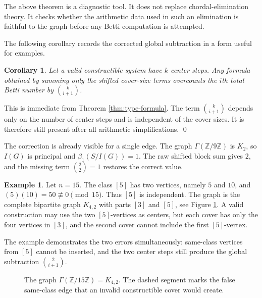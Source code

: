 \documentclass[12pt]{article}
\newtheorem{corollary}[theorem]{Corollary}
\theoremstyle{definition}
\newtheorem{example}[theorem]{Example}
\renewenvironment{proof}{{\bf \noindent Proof.}}{\qed}
\begin{document}
\medskip

The above theorem is a diagnostic tool.  It does not replace chordal-elimination theory. It checks whether the arithmetic data used in such an elimination is faithful to the graph before any Betti computation is attempted.

\medskip

\noindent The following corollary records the corrected global subtraction in a form useful for examples.
\begin{corollary}\label{cor:global-correction}
Let a valid constructible system have $k$ center steps.  Any formula obtained by summing only the shifted cover-size terms overcounts the $i$th total Betti number by $\binom{k}{i+1}$.
\end{corollary}

\begin{proof}
This is immediate from Theorem \ref{thm:type-formula}.  The term $\binom{k}{i+1}$ depends only on the number of center steps and is independent of the cover sizes.  It is therefore still present after all arithmetic simplifications.
\end{proof}

\medskip

The correction is already visible for a single edge.  The graph $\Gamma(\mathbb{Z}/9\mathbb{Z})$ is $K_2$, so $I(G)$ is principal and $\beta_1(S/I(G))=1$.  The raw shifted block sum gives $2$, and the missing term $\binom{2}{2}=1$ restores the correct value.

\medskip

\begin{example}\label{ex:diagnostic}
Let $n=15$.  The class $[5]$ has two vertices, namely $5$ and $10$, and $(5)(10)=50\not\equiv 0\pmod {15}$.  Thus $[5]$ is independent.  The graph is the complete bipartite graph $K_{4,2}$ with parts $[3]$ and $[5]$, see Figure \ref{fig:z15}.  A valid construction may use the two $[5]$-vertices as centers, but each cover has only the four vertices in $[3]$, and the second cover cannot include the first $[5]$-vertex.
\end{example}

\medskip

The example demonstrates the two errors simultaneously: same-class vertices from $[5]$ cannot be inserted, and the two center steps still produce the global subtraction $\binom{2}{i+1}$.

\medskip

\begin{figure}[h]
\centering
{}
\caption{The graph $\Gamma(\mathbb{Z}/15\mathbb{Z})=K_{4,2}$.  The dashed segment marks the false same-class edge that an invalid constructible cover would create.}
\label{fig:z15}
\end{figure}
\end{document}
